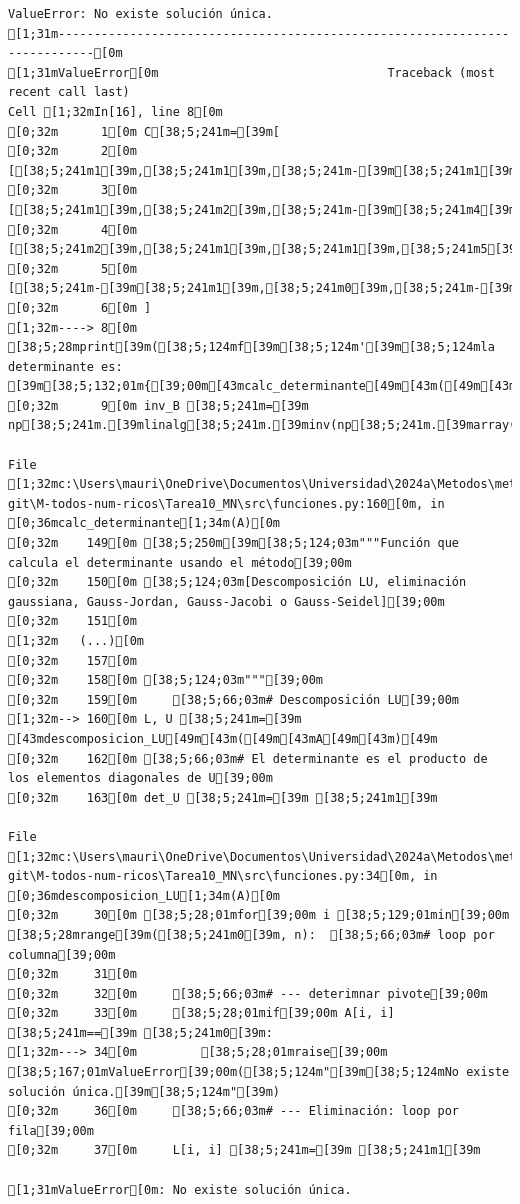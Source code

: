 \documentclass[
  letterpaper,
  DIV=11,
  numbers=noendperiod]{scrartcl}
\begin{document}
\begin{verbatim}
ValueError: No existe solución única.
[1;31m---------------------------------------------------------------------------[0m
[1;31mValueError[0m                                Traceback (most recent call last)
Cell [1;32mIn[16], line 8[0m
[0;32m      1[0m C[38;5;241m=[39m[
[0;32m      2[0m     [[38;5;241m1[39m,[38;5;241m1[39m,[38;5;241m-[39m[38;5;241m1[39m,[38;5;241m1[39m],
[0;32m      3[0m     [[38;5;241m1[39m,[38;5;241m2[39m,[38;5;241m-[39m[38;5;241m4[39m,[38;5;241m-[39m[38;5;241m2[39m],
[0;32m      4[0m     [[38;5;241m2[39m,[38;5;241m1[39m,[38;5;241m1[39m,[38;5;241m5[39m],
[0;32m      5[0m     [[38;5;241m-[39m[38;5;241m1[39m,[38;5;241m0[39m,[38;5;241m-[39m[38;5;241m2[39m,[38;5;241m-[39m[38;5;241m4[39m]
[0;32m      6[0m ]
[1;32m----> 8[0m [38;5;28mprint[39m([38;5;124mf[39m[38;5;124m'[39m[38;5;124mla determinante es: [39m[38;5;132;01m{[39;00m[43mcalc_determinante[49m[43m([49m[43mC[49m[43m)[49m[38;5;132;01m}[39;00m[38;5;124m'[39m)
[0;32m      9[0m inv_B [38;5;241m=[39m np[38;5;241m.[39mlinalg[38;5;241m.[39minv(np[38;5;241m.[39marray(B))

File [1;32mc:\Users\mauri\OneDrive\Documentos\Universidad\2024a\Metodos\metodos git\M-todos-num-ricos\Tarea10_MN\src\funciones.py:160[0m, in [0;36mcalc_determinante[1;34m(A)[0m
[0;32m    149[0m [38;5;250m[39m[38;5;124;03m"""Función que calcula el determinante usando el método[39;00m
[0;32m    150[0m [38;5;124;03m[Descomposición LU, eliminación gaussiana, Gauss-Jordan, Gauss-Jacobi o Gauss-Seidel][39;00m
[0;32m    151[0m 
[1;32m   (...)[0m
[0;32m    157[0m 
[0;32m    158[0m [38;5;124;03m"""[39;00m
[0;32m    159[0m     [38;5;66;03m# Descomposición LU[39;00m
[1;32m--> 160[0m L, U [38;5;241m=[39m [43mdescomposicion_LU[49m[43m([49m[43mA[49m[43m)[49m
[0;32m    162[0m [38;5;66;03m# El determinante es el producto de los elementos diagonales de U[39;00m
[0;32m    163[0m det_U [38;5;241m=[39m [38;5;241m1[39m

File [1;32mc:\Users\mauri\OneDrive\Documentos\Universidad\2024a\Metodos\metodos git\M-todos-num-ricos\Tarea10_MN\src\funciones.py:34[0m, in [0;36mdescomposicion_LU[1;34m(A)[0m
[0;32m     30[0m [38;5;28;01mfor[39;00m i [38;5;129;01min[39;00m [38;5;28mrange[39m([38;5;241m0[39m, n):  [38;5;66;03m# loop por columna[39;00m
[0;32m     31[0m 
[0;32m     32[0m     [38;5;66;03m# --- deterimnar pivote[39;00m
[0;32m     33[0m     [38;5;28;01mif[39;00m A[i, i] [38;5;241m==[39m [38;5;241m0[39m:
[1;32m---> 34[0m         [38;5;28;01mraise[39;00m [38;5;167;01mValueError[39;00m([38;5;124m"[39m[38;5;124mNo existe solución única.[39m[38;5;124m"[39m)
[0;32m     36[0m     [38;5;66;03m# --- Eliminación: loop por fila[39;00m
[0;32m     37[0m     L[i, i] [38;5;241m=[39m [38;5;241m1[39m

[1;31mValueError[0m: No existe solución única.
\end{verbatim}
\end{document}
